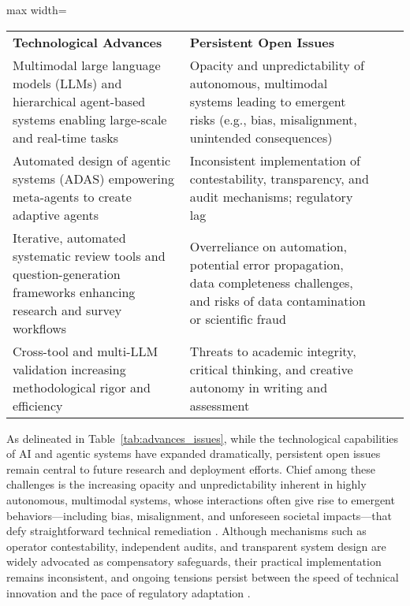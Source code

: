 \begin{table*}[htbp]
\centering
\caption{Key Technological Advances and Persistent Open Issues in AI and Agentic Systems}
\label{tab:advances_issues}
\begin{adjustbox}{max width=\textwidth}
\begin{tabular}{@{}llll@{}}
\toprule
\textbf{Technological Advances} & \textbf{Persistent Open Issues} &  &  \\
Multimodal large language models (LLMs) and hierarchical agent-based systems enabling large-scale and real-time tasks & Opacity and unpredictability of autonomous, multimodal systems leading to emergent risks (e.g., bias, misalignment, unintended consequences) &  &  \\
Automated design of agentic systems (ADAS) empowering meta-agents to create adaptive agents & Inconsistent implementation of contestability, transparency, and audit mechanisms; regulatory lag &  &  \\
Iterative, automated systematic review tools and question-generation frameworks enhancing research and survey workflows & Overreliance on automation, potential error propagation, data completeness challenges, and risks of data contamination or scientific fraud &  &  \\
Cross-tool and multi-LLM validation increasing methodological rigor and efficiency & Threats to academic integrity, critical thinking, and creative autonomy in writing and assessment &  &  \\
\bottomrule
\end{tabular}
\end{adjustbox}
\end{table*}

As delineated in Table~\ref{tab:advances_issues}, while the technological capabilities of AI and agentic systems have expanded dramatically, persistent open issues remain central to future research and deployment efforts. Chief among these challenges is the increasing opacity and unpredictability inherent in highly autonomous, multimodal systems, whose interactions often give rise to emergent behaviors—including bias, misalignment, and unforeseen societal impacts—that defy straightforward technical remediation \cite{ref95,ref96,ref100,ref110}. Although mechanisms such as operator contestability, independent audits, and transparent system design are widely advocated as compensatory safeguards, their practical implementation remains inconsistent, and ongoing tensions persist between the speed of technical innovation and the pace of regulatory adaptation \cite{ref97,ref98,ref100,ref106}.

